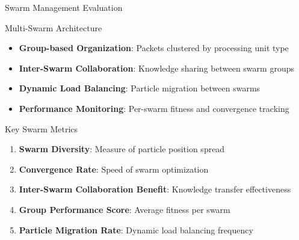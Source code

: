\documentclass[10pt,aspectratio=169]{beamer}
\begin{document}
\begin{frame}{Swarm Management Evaluation}
    \begin{block}{Multi-Swarm Architecture}
        \begin{itemize}
            \item \textbf{Group-based Organization}: Packets clustered by processing unit type
            \item \textbf{Inter-Swarm Collaboration}: Knowledge sharing between swarm groups
            \item \textbf{Dynamic Load Balancing}: Particle migration between swarms
            \item \textbf{Performance Monitoring}: Per-swarm fitness and convergence tracking
        \end{itemize}
    \end{block}
    
    \begin{block}{Key Swarm Metrics}
        \begin{enumerate}
            \item \textbf{Swarm Diversity}: Measure of particle position spread
            \item \textbf{Convergence Rate}: Speed of swarm optimization
            \item \textbf{Inter-Swarm Collaboration Benefit}: Knowledge transfer effectiveness
            \item \textbf{Group Performance Score}: Average fitness per swarm
            \item \textbf{Particle Migration Rate}: Dynamic load balancing frequency
        \end{enumerate}
    \end{block}
\end{frame}
\end{document}
